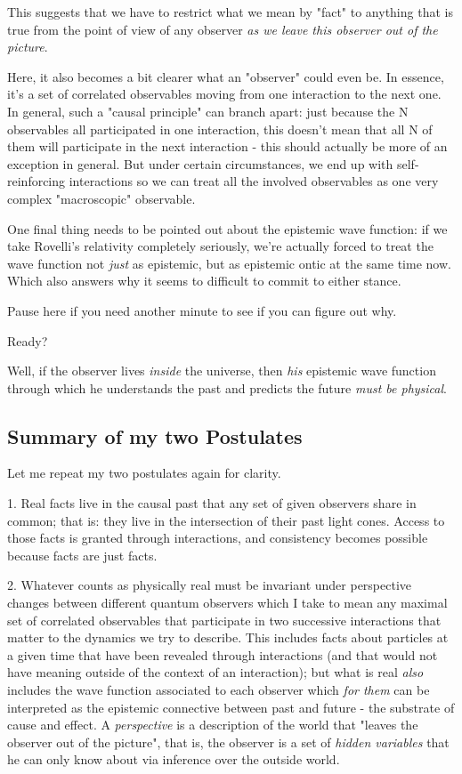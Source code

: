 \documentclass{article}
\begin{document}
This suggests that we have to restrict what we mean by "fact" to anything that is true from the point of view of any observer \textit{as we leave this observer out of the picture}.

Here, it also becomes a bit clearer what an "observer" could even be. In essence, it's a set of correlated observables moving from one interaction to the next one. In general, such a "causal principle" can branch apart: just because the N observables all participated in one interaction, this doesn't mean that all N of them will participate in the next interaction - this should actually be more of an exception in general. But under certain circumstances, we end up with self-reinforcing interactions so we can treat all the involved observables as one very complex "macroscopic" observable.

One final thing needs to be pointed out about the epistemic wave function: if we take Rovelli's relativity completely seriously, we're actually forced to treat the wave function not \textit{just} as epistemic, but as  epistemic  ontic at the same time now. Which also answers why it seems to difficult to commit to either stance.

Pause here if you need another minute to see if you can figure out why.

Ready?

Well, if the observer lives \textit{inside} the universe, then \textit{his} epistemic wave function through which he understands the past and predicts the future \textit{must be physical}.

\subsection{Summary of my two Postulates}

Let me repeat my two postulates again for clarity.

1. Real facts live in the causal past that any set of given observers share in common; that is: they live in the intersection of their past light cones. Access to those facts is granted through interactions, and consistency becomes possible because facts are just facts.

2. Whatever counts as physically real must be invariant under perspective changes between different quantum observers which I take to mean any maximal set of correlated observables that participate in two successive interactions that matter to the dynamics we try to describe. This includes facts about particles at a given time that have been revealed through interactions (and that would not have meaning outside of the context of an interaction); but what is real \textit{also} includes the wave function associated to each observer which \textit{for them} can be interpreted as the epistemic connective between past and future - the substrate of cause and effect. A \textit{perspective} is a description of the world that "leaves the observer out of the picture", that is, the observer is a set of \textit{hidden variables} that he can only know about via inference over the outside world.
\end{document}
